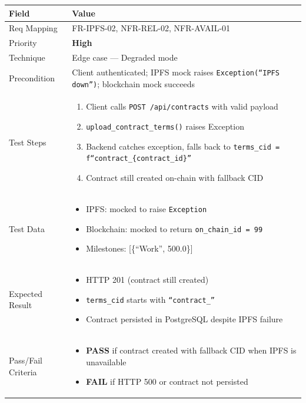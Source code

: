 \documentclass[12pt,a4paper]{article}
\newcommand{\sevhigh}{\textcolor{severityhigh}{\textbf{High}}}
\newcommand{\passresult}{\textcolor{passgreen}{\textbf{PASS}}}
\newcommand{\failresult}{\textcolor{failred}{\textbf{FAIL}}}
\begin{document}
\begin{tabular}{|p{}|p{}|}
\hline
\rowcolor{lightblue} \textbf{Field} & \textbf{Value} \\
\hline
Req Mapping & FR-IPFS-02, NFR-REL-02, NFR-AVAIL-01 \\
\hline
Priority & \sevhigh \\
\hline
Technique & Edge case --- Degraded mode \\
\hline
Precondition & Client authenticated; IPFS mock raises \texttt{Exception(``IPFS down'')}; blockchain mock succeeds \\
\hline
Test Steps &
\begin{enumerate}[nosep, leftmargin=*]
  \item Client calls \texttt{POST /api/contracts} with valid payload
  \item \texttt{upload\_contract\_terms()} raises Exception
  \item Backend catches exception, falls back to \texttt{terms\_cid = f``contract\_\{contract\_id\}''}
  \item Contract still created on-chain with fallback CID
\end{enumerate} \\
\hline
Test Data &
\begin{itemize}[nosep, leftmargin=*]
  \item IPFS: mocked to raise \texttt{Exception}
  \item Blockchain: mocked to return \texttt{on\_chain\_id = 99}
  \item Milestones: [\{``Work'', 500.0\}]
\end{itemize} \\
\hline
Expected Result &
\begin{itemize}[nosep, leftmargin=*]
  \item HTTP 201 (contract still created)
  \item \texttt{terms\_cid} starts with \texttt{``contract\_''}
  \item Contract persisted in PostgreSQL despite IPFS failure
\end{itemize} \\
\hline
Pass/Fail Criteria &
\begin{itemize}[nosep, leftmargin=*]
  \item \passresult{} if contract created with fallback CID when IPFS is unavailable
  \item \failresult{} if HTTP 500 or contract not persisted
\end{itemize} \\
\hline
\end{tabular}
\end{document}
